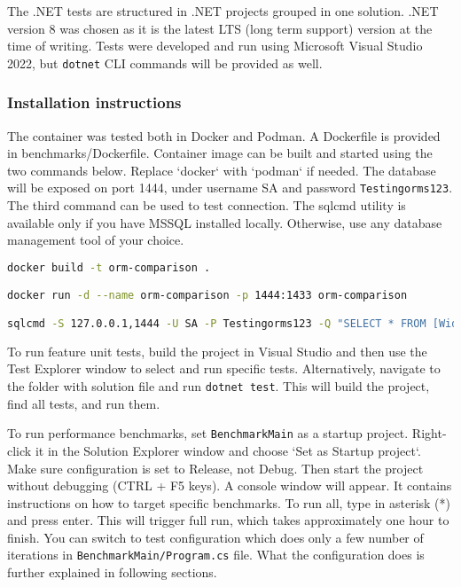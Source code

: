 The .NET tests are structured in .NET projects grouped in one solution. .NET version 8 was chosen as it is the latest LTS (long term support) version at the time of writing\cite{NETversions}. Tests were developed and run using Microsoft Visual Studio 2022, but \texttt{dotnet} CLI commands will be provided as well.

\subsubsection{Installation instructions}
The container was tested both in Docker and Podman. A Dockerfile is provided in benchmarks/Dockerfile. Container image can be built and started using the two commands below. Replace `docker` with `podman` if needed. The database will be exposed on port 1444, under username SA and password \texttt{Testingorms123}.
The third command can be used to test connection. The sqlcmd utility is available only if you have MSSQL installed locally. Otherwise, use any database management tool of your choice.

\begin{lstlisting}[language=sh]
docker build -t orm-comparison .

docker run -d --name orm-comparison -p 1444:1433 orm-comparison

sqlcmd -S 127.0.0.1,1444 -U SA -P Testingorms123 -Q "SELECT * FROM [WideWorldImporters].[Purchasing].[PurchaseOrders]"
\end{lstlisting}

To run feature unit tests, build the project in Visual Studio and then use the Test Explorer window to select and run specific tests. Alternatively, navigate to the folder with solution file and run \lstinline{dotnet test}. This will build the project, find all tests, and run them. 

To run performance benchmarks, set \texttt{BenchmarkMain} as a startup project. Right-click it in the Solution Explorer window and choose `Set as Startup project`. Make sure configuration is set to Release, not Debug. Then start the project without debugging (CTRL + F5 keys). A console window will appear. It contains instructions on how to target specific benchmarks. To run all, type in asterisk (*) and press enter. This will trigger full run, which takes approximately one hour to finish. You can switch to test configuration which does only a few number of iterations in \texttt{BenchmarkMain/Program.cs} file. What the configuration does is further explained in following sections. 

